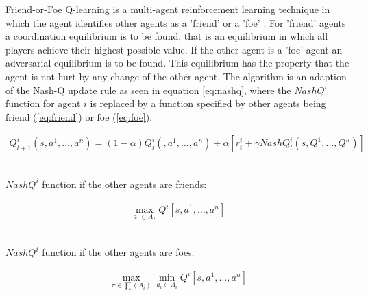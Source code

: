 Friend-or-Foe Q-learning is a multi-agent reinforcement learning technique in which the agent identifies other agents as a 'friend' or a 'foe' . For 'friend' agents a coordination equilibrium is to be found, that is an equilibrium in which all players achieve their highest possible value. If the other agent is a 'foe' agent an adversarial equilibrium is to be found. This equilibrium has the property that the agent is not hurt by any change of the other agent. The algorithm is an adaption of the Nash-Q update rule as seen in equation \ref{eq:nashq}, where the $NashQ^i$ function for agent $i$ is replaced by a function specified by other agents being friend (\ref{eq:friend}) or foe  (\ref{eq:foe}). \\
\begin{mdframed}
\begin{align}
Q_{t+1}^i(s,a^1, \dots, a^n) = (1-\alpha)Q_t^i(,a^1, \dots, a^n )+ \alpha[r_t^i+\gamma NashQ_t^i(s, Q^1, \dots, Q^n)]\label{eq:nashq}
\end{align}
\end{mdframed}

~\\$NashQ^i$ function if the other agents are friends:\\
\begin{mdframed}
\begin{align}
\max\limits_{a_1\in A_1} Q^i[s,a^1, \dots, a^n]\label{eq:friend}
\end{align}
\end{mdframed}

~\\$NashQ^i$ function if the other agents are foes:\\
\begin{mdframed}
\begin{align}
\max\limits_{\pi \in \prod(A_i)} \min\limits_{a_i \in A_i} Q^i[s,a^1, \dots, a^n]\label{eq:foe}
\end{align}
\end{mdframed}


